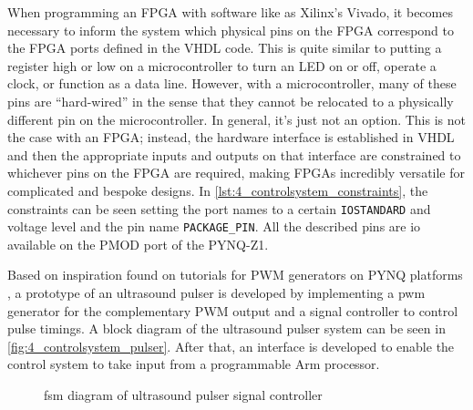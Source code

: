 When programming an FPGA with software like as Xilinx's Vivado, it becomes necessary to inform the system which physical pins on the FPGA correspond to the FPGA ports defined in the VHDL code. This is quite similar to putting a register high or low on a microcontroller to turn an LED on or off, operate a clock, or function as a data line. However, with a microcontroller, many of these pins are \enquote{hard-wired} in the sense that they cannot be relocated to a physically different pin on the microcontroller. In general, it's just not an option. This is not the case with an FPGA; instead, the hardware interface is established in VHDL and then the appropriate inputs and outputs on that interface are constrained to whichever pins on the FPGA are required, making FPGAs incredibly versatile for complicated and bespoke designs. In \cref{lst:4_controlsystem_constraints}, the constraints can be seen setting the port names to a certain \texttt{IOSTANDARD} and voltage level and the pin name \texttt{PACKAGE\_PIN}. All the described pins are \gls{io} available on the PMOD port of the PYNQ-Z1.

Based on inspiration found on tutorials for PWM generators on PYNQ platforms \cite{jan_cumps,vhdl_pwm_gen}, a prototype of an ultrasound pulser is developed by implementing a \gls{pwm} generator for the complementary PWM output and a signal controller to control pulse timings. A block diagram of the ultrasound pulser system can be seen in \cref{fig:4_controlsystem_pulser}. After that, an interface is developed to enable the control system to take input from a programmable Arm processor.

\begin{figure}[htbp]
	\centering
	\caption{\gls{fsm} diagram of ultrasound pulser signal controller}
	\label{fig:4_controlsystem_fsm_diagram}
\end{figure}

